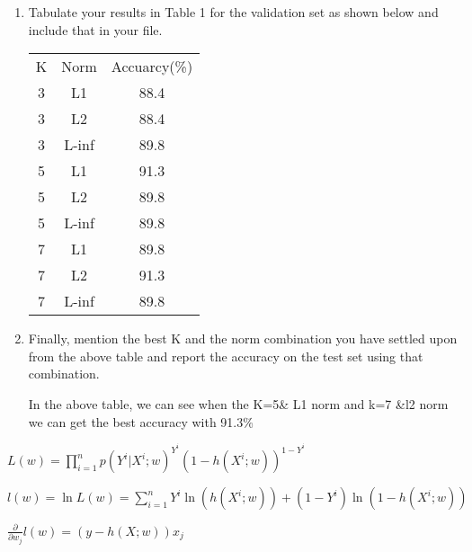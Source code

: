\documentclass[a4paper]{article}
\begin{document}
\begin{enumerate}
\begin{enumerate}
			\item
			Tabulate your results in Table 1 for the validation set as shown below and include that in your file.
			\begin{center}
			\begin{tabular}{ccc}
				\hline
				K&Norm&Accuarcy(\%)\\
				3&L1&88.4\\
				3&L2&88.4\\
				3&L-inf&89.8\\
				\hline
				5&L1&91.3\\
				5&L2&89.8\\
				5&L-inf&89.8\\
				\hline
				7&L1&89.8\\
				7&L2&91.3\\
				7&L-inf&89.8\\
				\hline
			\end{tabular}
			\end{center}
			\item
			Finally, mention the best K and the norm combination you have settled upon from the above table and report the accuracy on the test set using that combination.
			\begin{solution}
				In the above table, we can see when the K=5\& L1 norm and k=7 \&l2 norm we can get the best accuracy with 91.3\%
			\end{solution}
		\end{enumerate}
		\begin{solution}
			$L(w) = \prod \limits_{i=1}^n p(Y^i|X^i;w)^{Y^i}(1-h(X^i;w))^{1-Y^i}$
			
			$l(w) = \ln L(w) = \sum \limits_{i= 1}^{n}Y^i \ln (h(X^i;w)) + (1-Y^i)\ln(1-h(X^i;w))$
			
			$\frac{\partial}{\partial w_j}l(w) = (y-h(X;w))x_j$
		\end{solution}
		
	\end{enumerate}
\end{document}
